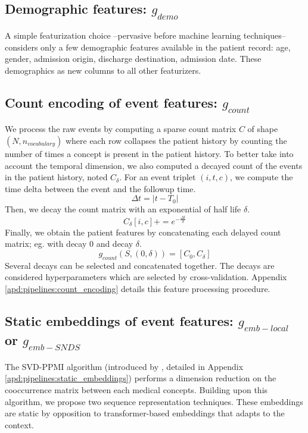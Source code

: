 \documentclass[french,12pt,twoside,a4paper]{book}
\begin{document}
\subsection{Demographic features: $g_{demo}$}\label{subsec:predictive_models:demographic}

A simple featurization choice --pervasive before machine learning techniques--
considers only a few demographic features available in the patient record: age,
gender, admission origin, discharge destination, admission date. These
demographics as new columns to all other featurizers.

\subsection{Count encoding of event features: $g_{count}$}\label{subsec:predictive_models:count_encoding}

We process the raw events by computing a sparse count matrix $C$ of shape
$(N, n_{vocabulary})$ where each row collapses the patient history by
counting the number of times a concept is present in the patient history. To
better take into account the temporal dimension, we also computed a decayed
count of the events in the patient history, noted $C_{\delta}$. For an event
triplet $(i, t, c)$, we compute the time delta between the event and the followup
time.
$$\Delta t = |t-T_0|$$
Then, we decay the count matrix with an exponential of half life $\delta$.
$$C_{\delta}[i, c] += e^{-\frac{\Delta t}{\delta}}$$%
Finally, we obtain the patient features by concatenating each
delayed count matrix; eg. with decay 0 and decay $\delta$.
$$g_{count}(S, (0, \delta))= [C_{0}, C_{\delta}]$$%
Several decays can be selected and concatenated together. The decays are
considered hyperparameters which are selected by cross-validation. Appendix
\ref{apd:pipelines:count_encoding} details this feature processing procedure.

\subsection{Static embeddings of event features: $g_{emb-local}$ or $g_{emb-SNDS}$}

The SVD-PPMI algorithm (introduced by \cite{beam2018big}, detailed in Appendix
\ref{apd:pipelines:static_embeddings}) performs a dimension reduction on the
cooccurrence matrix between each medical concepts. Building upon this algorithm,
we propose two sequence representation techniques. These embeddings are static
by opposition to transformer-based embeddings that adapts to the context.
\end{document}
